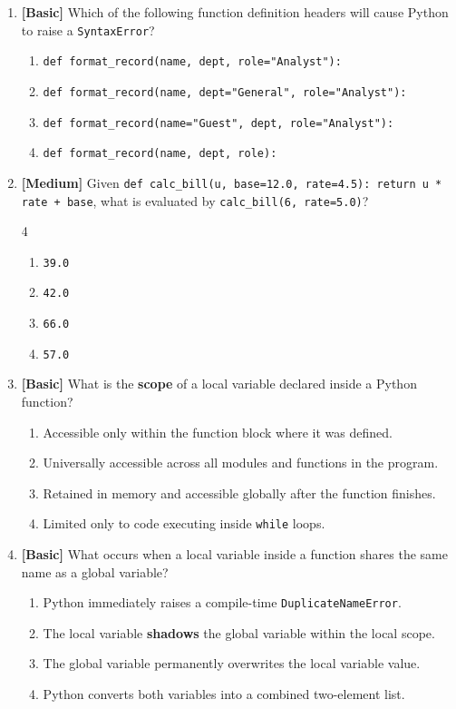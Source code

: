 \documentclass[11pt,a4paper]{article}
\begin{document}
\begin{enumerate}[label=\textbf{Q\arabic*.},leftmargin=1.8em,itemsep=0.7pt,topsep=0.3pt,resume]

\item \textbf{[Basic]} Which of the following function definition headers will cause Python to raise a \texttt{SyntaxError}?
\begin{enumerate}[label=\Alph*.,leftmargin=1.8em]
  \item \texttt{def format\_record(name, dept, role="Analyst"):}
  \item \texttt{def format\_record(name, dept="General", role="Analyst"):}
  \item \texttt{def format\_record(name="Guest", dept, role="Analyst"):}
  \item \texttt{def format\_record(name, dept, role):}
\end{enumerate}

\item \textbf{[Medium]} Given \texttt{def calc\_bill(u, base=12.0, rate=4.5): return u * rate + base}, what is evaluated by \texttt{calc\_bill(6, rate=5.0)}?
\begin{multicols}{4}
\begin{enumerate}[label=\Alph*.]
  \item \texttt{39.0}
  \item \texttt{42.0}
  \item \texttt{66.0}
  \item \texttt{57.0}
\end{enumerate}
\end{multicols}

\item \textbf{[Basic]} What is the \textbf{scope} of a local variable declared inside a Python function?
\begin{enumerate}[label=\Alph*.,leftmargin=1.8em]
  \item Accessible only within the function block where it was defined.
  \item Universally accessible across all modules and functions in the program.
  \item Retained in memory and accessible globally after the function finishes.
  \item Limited only to code executing inside \texttt{while} loops.
\end{enumerate}

\item \textbf{[Basic]} What occurs when a local variable inside a function shares the same name as a global variable?
\begin{enumerate}[label=\Alph*.,leftmargin=1.8em]
  \item Python immediately raises a compile-time \texttt{DuplicateNameError}.
  \item The local variable \textbf{shadows} the global variable within the local scope.
  \item The global variable permanently overwrites the local variable value.
  \item Python converts both variables into a combined two-element list.
\end{enumerate}


\end{enumerate}
\end{document}
